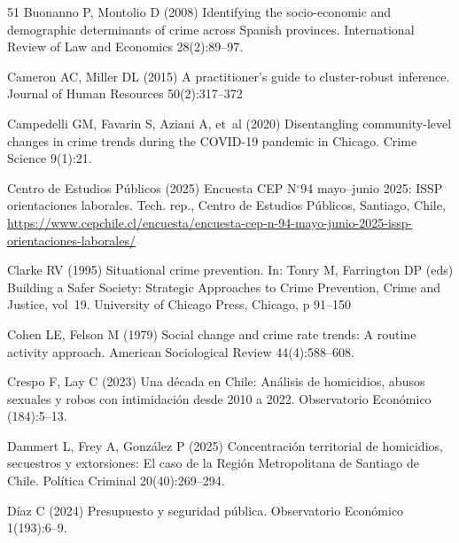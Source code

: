 \documentclass[pdflatex,sn-basic]{sn-jnl}
\begin{document}
\begin{thebibliography}{51}
Buonanno P, Montolio D (2008) Identifying the socio-economic and demographic
  determinants of crime across {Spanish} provinces. International Review of Law
  and Economics 28(2):89--97. 

Cameron AC, Miller DL (2015) A practitioner's guide to cluster-robust
  inference. Journal of Human Resources 50(2):317--372

Campedelli GM, Favarin S, Aziani A, et~al (2020) Disentangling community-level
  changes in crime trends during the {COVID-19} pandemic in {Chicago}. Crime
  Science 9(1):21. 

{Centro de Estudios P\'ublicos} (2025) Encuesta {CEP} {N}$^\circ$94 mayo--junio
  2025: {ISSP} orientaciones laborales. Tech. rep., Centro de Estudios
  P\'ublicos, Santiago, Chile,
  \urlprefix\url{https://www.cepchile.cl/encuesta/encuesta-cep-n-94-mayo-junio-2025-issp-orientaciones-laborales/}

Clarke RV (1995) Situational crime prevention. In: Tonry M, Farrington DP (eds)
  Building a Safer Society: Strategic Approaches to Crime Prevention, Crime and
  Justice, vol~19. University of Chicago Press, Chicago, p 91--150

Cohen LE, Felson M (1979) Social change and crime rate trends: {A} routine
  activity approach. American Sociological Review 44(4):588--608.

Crespo F, Lay C (2023) Una d\'ecada en {Chile}: {A}n\'alisis de homicidios,
  abusos sexuales y robos con intimidaci\'on desde 2010 a 2022. Observatorio
  Econ\'omico (184):5--13. 

Dammert L, Frey A, Gonz\'alez P (2025) Concentraci\'on territorial de
  homicidios, secuestros y extorsiones: {E}l caso de la {Regi\'on
  Metropolitana} de {Santiago de Chile}. Pol\'itica Criminal 20(40):269--294.

D\'iaz C (2024) Presupuesto y seguridad p\'ublica. Observatorio Econ\'omico
  1(193):6--9. 


\end{thebibliography}
\end{document}
